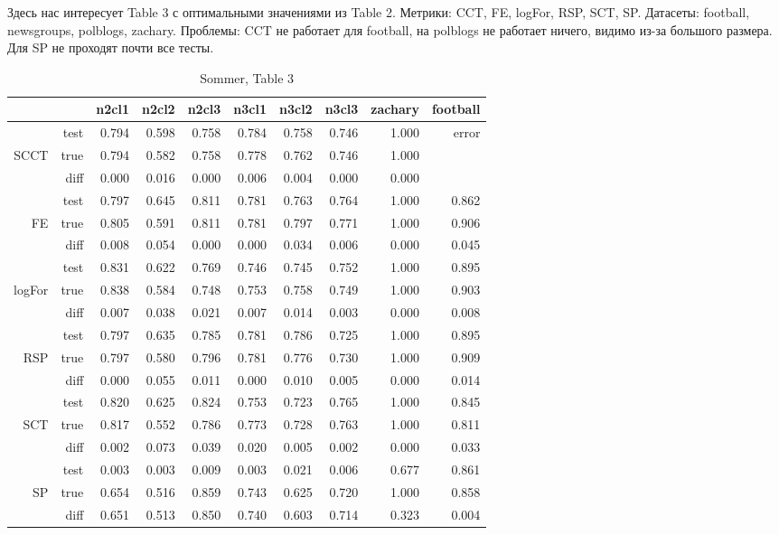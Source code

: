 \documentclass{article}
\begin{document}
Здесь нас интересует Table 3 с оптимальными значениями из Table 2.
Метрики: CCT, FE, logFor, RSP, SCT, SP.
Датасеты: football, newsgroups, polblogs, zachary.
Проблемы: CCT не работает для football, на polblogs не работает ничего, видимо из-за большого размера. Для SP не проходят почти все тесты.

\begin{table}[H]
\centering
\caption{Sommer, Table 3}
\label{my-label}
\begin{tabular}{rr|rrrrrrrr}
       &      & n2cl1 & n2cl2 & n2cl3 & n3cl1 & n3cl2 & n3cl3 & zachary & football \\
       \hline
       & test & 0.794 & 0.598 & 0.758 & 0.784 & 0.758 & 0.746 & 1.000   & \cellcolor{red!25} error    \\
SCCT   & true & 0.794 & 0.582 & 0.758 & 0.778 & 0.762 & 0.746 & 1.000   &          \\
       & diff & 0.000 & 0.016 & 0.000 & 0.006 & 0.004 & 0.000 & 0.000   &          \\
       \hline
       & test & 0.797 & 0.645 & 0.811 & 0.781 & 0.763 & 0.764 & 1.000   & 0.862    \\
FE     & true & 0.805 & 0.591 & 0.811 & 0.781 & 0.797 & 0.771 & 1.000   & 0.906    \\
       & diff & 0.008 & 0.054 & 0.000 & 0.000 & 0.034 & 0.006 & 0.000   & 0.045    \\
       \hline
       & test & 0.831 & 0.622 & 0.769 & 0.746 & 0.745 & 0.752 & 1.000   & 0.895    \\
logFor & true & 0.838 & 0.584 & 0.748 & 0.753 & 0.758 & 0.749 & 1.000   & 0.903    \\
       & diff & 0.007 & 0.038 & 0.021 & 0.007 & 0.014 & 0.003 & 0.000   & 0.008    \\
       \hline
       & test & 0.797 & 0.635 & 0.785 & 0.781 & 0.786 & 0.725 & 1.000   & 0.895    \\
RSP    & true & 0.797 & 0.580 & 0.796 & 0.781 & 0.776 & 0.730 & 1.000   & 0.909    \\
       & diff & 0.000 & 0.055 & 0.011 & 0.000 & 0.010 & 0.005 & 0.000   & 0.014    \\
       \hline
       & test & 0.820 & 0.625 & 0.824 & 0.753 & 0.723 & 0.765 & 1.000   & 0.845    \\
SCT    & true & 0.817 & 0.552 & 0.786 & 0.773 & 0.728 & 0.763 & 1.000   & 0.811    \\
       & diff & 0.002 & 0.073 & 0.039 & 0.020 & 0.005 & 0.002 & 0.000   & 0.033    \\
       \hline
       & test & 0.003 & 0.003 & 0.009 & 0.003 & 0.021 & 0.006 & 0.677   & 0.861    \\
SP     & true & 0.654 & 0.516 & 0.859 & 0.743 & 0.625 & 0.720 & 1.000   & 0.858    \\
       & diff & \cellcolor{red!25} 0.651 & \cellcolor{red!25} 0.513 & \cellcolor{red!25} 0.850 &
                \cellcolor{red!25} 0.740 & \cellcolor{red!25} 0.603 & \cellcolor{red!25} 0.714 & \cellcolor{yellow!25} 0.323   & 0.004   
\end{tabular}
\end{table}
\end{document}
